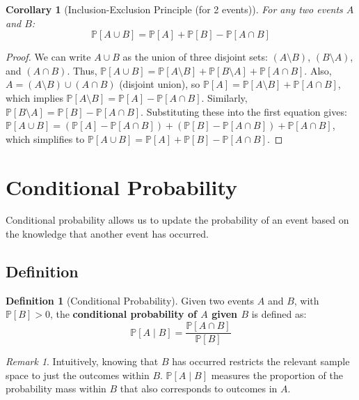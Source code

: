 \documentclass[12pt, a4paper]{article}
\theoremstyle{definition}
\newtheorem{definition}{Definition}[section]
\theoremstyle{plain}
\newtheorem{corollary}{Corollary}[section]
\theoremstyle{remark}
\newtheorem{remark}{Remark}[section]
\begin{document}
\begin{corollary}[Inclusion-Exclusion Principle (for 2 events)]
    For \emph{any} two events $A$ and $B$:
    $$\mathbb{P}[A \cup B] = \mathbb{P}[A] + \mathbb{P}[B] - \mathbb{P}[A \cap B]$$ \cite{faculty_prob, ross, chan}
\end{corollary}
\begin{proof}
    We can write $A \cup B$ as the union of three disjoint sets: $(A \setminus B)$, $(B \setminus A)$, and $(A \cap B)$.
    Thus, $\mathbb{P}[A \cup B] = \mathbb{P}[A \setminus B] + \mathbb{P}[B \setminus A] + \mathbb{P}[A \cap B]$.
    Also, $A = (A \setminus B) \cup (A \cap B)$ (disjoint union), so $\mathbb{P}[A] = \mathbb{P}[A \setminus B] + \mathbb{P}[A \cap B]$, which implies $\mathbb{P}[A \setminus B] = \mathbb{P}[A] - \mathbb{P}[A \cap B]$.
    Similarly, $\mathbb{P}[B \setminus A] = \mathbb{P}[B] - \mathbb{P}[A \cap B]$.
    Substituting these into the first equation gives:
    $\mathbb{P}[A \cup B] = (\mathbb{P}[A] - \mathbb{P}[A \cap B]) + (\mathbb{P}[B] - \mathbb{P}[A \cap B]) + \mathbb{P}[A \cap B]$,
    which simplifies to $\mathbb{P}[A \cup B] = \mathbb{P}[A] + \mathbb{P}[B] - \mathbb{P}[A \cap B]$.
\end{proof}

\section{Conditional Probability}

Conditional probability allows us to update the probability of an event based on the knowledge that another event has occurred.

\subsection{Definition}

\begin{definition}[Conditional Probability]
    Given two events $A$ and $B$, with $\mathbb{P}[B] > 0$, the \textbf{conditional probability of $A$ given $B$} is defined as:
    $$\mathbb{P}[A \mid B] = \frac{\mathbb{P}[A \cap B]}{\mathbb{P}[B]}$$ \cite{faculty_prob}
\end{definition}

\begin{remark}
    Intuitively, knowing that $B$ has occurred restricts the relevant sample space to just the outcomes within $B$. $\mathbb{P}[A \mid B]$ measures the proportion of the probability mass within $B$ that also corresponds to outcomes in $A$.
\end{remark}
\end{document}
